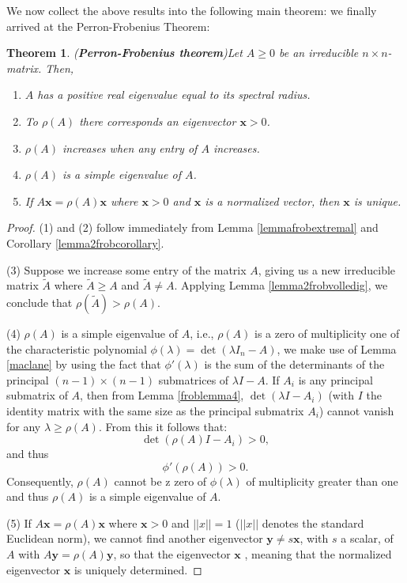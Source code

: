 \documentclass[a4paper,11pt]{report}
\newtheorem{theorem}{Theorem}[section]
\begin{document}
We now collect the above results into the following main theorem: we finally 
arrived at the Perron-Frobenius Theorem:
\begin{theorem}(\textbf{Perron-Frobenius theorem})\label{frobtheorem}
  Let $A \geq 0$ be an irreducible $n\times n$-matrix. Then,
  \begin{enumerate}
    \item $A$ has a positive real eigenvalue equal to its spectral radius.
    \item To $\rho(A)$ there corresponds an eigenvector $\mathbf{x} > 0$.
    \item $\rho(A)$ increases when any entry of $A$ increases.
    \item $\rho(A)$ is a simple eigenvalue of $A$.
    \item If $A\mathbf{x} = \rho(A)\mathbf{x}$ where $\mathbf{x} > 0$ and $\mathbf{x}$ 
    is a normalized vector, then $\mathbf{x}$ is unique.
    
  \end{enumerate}
  \end{theorem}
 \begin{proof}
  (1) and (2) follow immediately from Lemma \ref{lemmafrobextremal} and 
   Corollary \ref{lemma2frobcorollary}. 
   
  (3) Suppose we increase 
   some entry of the matrix $A$, giving us a new irreducible matrix $\tilde{A}$ 
   where $\tilde{A} \geq A$ and  $\tilde{A} \not = A$. Applying Lemma 
   \ref{lemma2frobvolledig}, we conclude that $\rho(\tilde{A}) > \rho(A).$ 
   
   (4) $\rho(A)$ is a simple eigenvalue of $A$, i.e., $\rho(A)$ is a zero of multiplicity one of the characteristic polynomial
   $\phi(\lambda) = \det(\lambda I_n - A)$, we make use of Lemma \ref{maclane} by using the fact that $\phi'(\lambda)$ is the sum of the
   determinants of the principal $(n-1)\times(n-1)$ submatrices of $\lambda I - A$. If $A_i$ is any principal submatrix of
   $A$, then from Lemma \ref{froblemma4}, $\det(\lambda I - A_i)$ (with $I$ the identity matrix with the same size as the principal submatrix $A_i$) cannot vanish 
   for any $\lambda \geq \rho(A)$. From this it follows that:
   $$\det(\rho(A)I - A_i) > 0,$$
   and thus
   $$\phi'(\rho(A)) > 0.$$
   Consequently, $\rho(A)$ cannot be z zero of $\phi(\lambda)$ of multiplicity 
   greater than one and thus $\rho(A)$ is a simple eigenvalue of $A$. 
   
  (5) If $A\mathbf{x} = \rho(A)\mathbf{x}$ where $\mathbf{x} > 0$ 
   and $||x|| = 1$ ($||x||$ denotes the standard Euclidean norm), we cannot find 
   another eigenvector $\mathbf{y} \not = s\mathbf{x}$, with $s$ a scalar, of $A$ 
   with $A\mathbf{y} = \rho(A)\mathbf{y}$, so that the eigenvector $\mathbf{x}$ 
   , meaning that the normalized eigenvector $\mathbf{x}$ is uniquely 
   determined.
       \end{proof}
\end{document}
